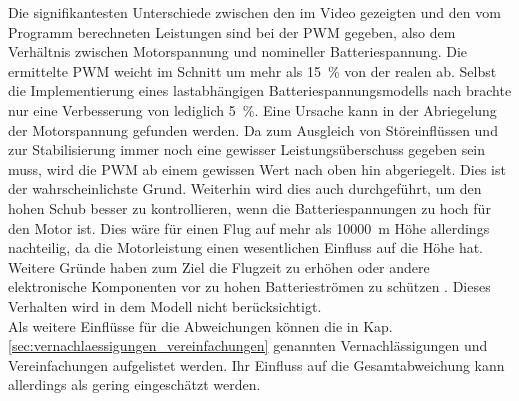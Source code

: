 Die signifikantesten Unterschiede zwischen den im Video gezeigten und den vom Programm berechneten Leistungen sind bei der PWM gegeben, also dem Verhältnis zwischen Motorspannung und nomineller Batteriespannung. Die ermittelte PWM weicht im Schnitt um mehr als \SI{15}{\%} von der realen ab. Selbst die Implementierung eines lastabhängigen Batteriespannungsmodells nach \cite{Tremblay.2009} brachte nur eine Verbesserung von lediglich \SI{5}{\%}. Eine Ursache kann in der Abriegelung der Motorspannung gefunden werden. Da zum Ausgleich von Störeinflüssen und zur Stabilisierung immer noch eine gewisser Leistungsüberschuss gegeben sein muss, wird die PWM ab einem gewissen Wert nach oben hin abgeriegelt. Dies ist der wahrscheinlichste Grund. Weiterhin wird dies auch durchgeführt, um den hohen Schub besser zu kontrollieren, wenn die Batteriespannungen zu hoch für den Motor ist. Dies wäre für einen Flug auf mehr als \SI{10000}{m} Höhe allerdings nachteilig, da die Motorleistung einen wesentlichen Einfluss auf die Höhe hat. Weitere Gründe haben zum Ziel die Flugzeit zu erhöhen oder andere elektronische Komponenten vor zu hohen Batterieströmen zu schützen \cite{arducopter.clav,arducopter.mts,betaflight}.
Dieses Verhalten wird in dem Modell nicht berücksichtigt. \\
Als weitere Einflüsse für die Abweichungen können die in Kap. \ref{sec:vernachlaessigungen_vereinfachungen} genannten Vernachlässigungen und Vereinfachungen aufgelistet werden. Ihr Einfluss auf die Gesamtabweichung kann allerdings als gering eingeschätzt werden.
